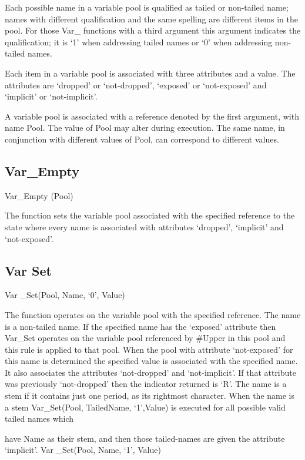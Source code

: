 Each possible name in a variable pool is qualified as tailed or
non-tailed name; names with different qualification and the same
spelling are different items in the pool. For those Var\_ functions with
a third argument this argument indicates the qualification; it is `1'
when addressing tailed names or `0' when addressing non-tailed names.

Each item in a variable pool is associated with three attributes and a
value. The attributes are `dropped' or `not-dropped', `exposed' or
`not-exposed' and `implicit' or `not-implicit'.

A variable pool is associated with a reference denoted by the first
argument, with name Pool. The value of Pool may alter during execution.
The same name, in conjunction with different values of Pool, can
correspond to different values.

\subsection{Var\_Empty}\label{var_empty}

Var\_Empty (Pool)

The function sets the variable pool associated with the specified
reference to the state where every name is associated with attributes
`dropped', `implicit' and `not-exposed'.

\subsection{Var Set}\label{var-set}

Var \_Set(Pool, Name, `0', Value)

The function operates on the variable pool with the specified reference.
The name is a non-tailed name. If the specified name has the `exposed'
attribute then Var\_Set operates on the variable pool referenced by
\#Upper in this pool and this rule is applied to that pool. When the
pool with attribute `not-exposed' for this name is determined the
specified value is associated with the specified name. It also
associates the attributes `not-dropped' and `not-implicit'. If that
attribute was previously `not-dropped' then the indicator returned is
`R'. The name is a stem if it contains just one period, as its rightmost
character. When the name is a stem Var\_Set(Pool, TailedName, `1',Value)
is executed for all possible valid tailed names which

have Name as their stem, and then those tailed-names are given the
attribute `implicit'. Var \_Set(Pool, Name, `1', Value)


